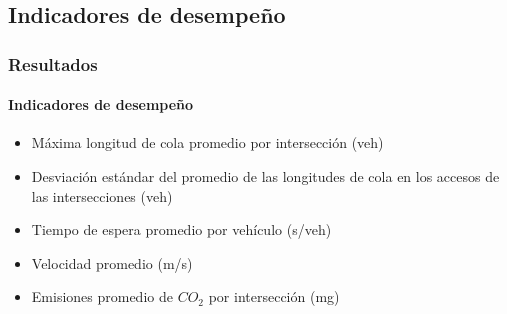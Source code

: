\documentclass[11pt]{beamer}
\begin{document}
\begin{frame}
\begin{columns}[T]
\begin{column}{.53\textwidth}
\end{column}
\end{columns}
\end{frame}

\subsection{Indicadores de desempeño}
\begin{frame}
\frametitle{Resultados}
\framesubtitle{Indicadores de desempeño}
\begin{itemize}
\item Máxima longitud de cola promedio por intersección (veh)
\item Desviación estándar del promedio de las longitudes de cola en los accesos de las intersecciones (veh)
\item Tiempo de espera promedio por vehículo (s/veh)
\item Velocidad promedio (m/s)
\item  Emisiones promedio de $CO_2$ por intersección (mg)
\end{itemize}

\end{frame}
\end{document}
